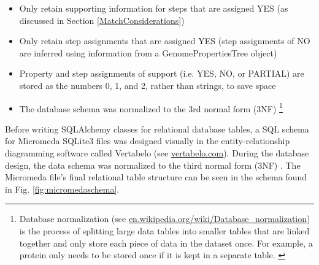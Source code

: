 \begin{itemize}
\item Only retain supporting information for steps that are assigned YES (as discussed in Section \ref{MatchConsiderations})
\item Only retain step assignments that are assigned YES (step assignments of NO are inferred using information from a GenomePropertiesTree object)
\item Property and step assignments of support (i.e. YES, NO, or PARTIAL) are stored as the numbers 0, 1, and 2, rather than strings, to save space
\item The database schema was normalized to the 3rd normal form (3NF) \cite{beeri1989sophisticate} \footnote{Database normalization (see \href{en.wikipedia.org/wiki/Database\_normalization}{en.wikipedia.org/wiki/Database\_normalization}) is the process of splitting large data tables into smaller tables that are linked together and only store each piece of data in the dataset once.  For example, a protein only needs to be stored once if it is kept in a separate table. \label{normailization-note}} 
\end{itemize}

Before writing SQLAlchemy classes for relational database tables, a SQL schema for Micromeda SQLite3 files was designed visually in the entity-relationship diagramming software called Vertabelo (see \href{www.vertabelo.com}{vertabelo.com}). During the database design, the data schema was normalized to the third normal form (3NF) \cite{beeri1989sophisticate}. The Micromeda file's final relational table structure can be seen in the schema found in Fig. \ref{fig:micromedaschema}.

